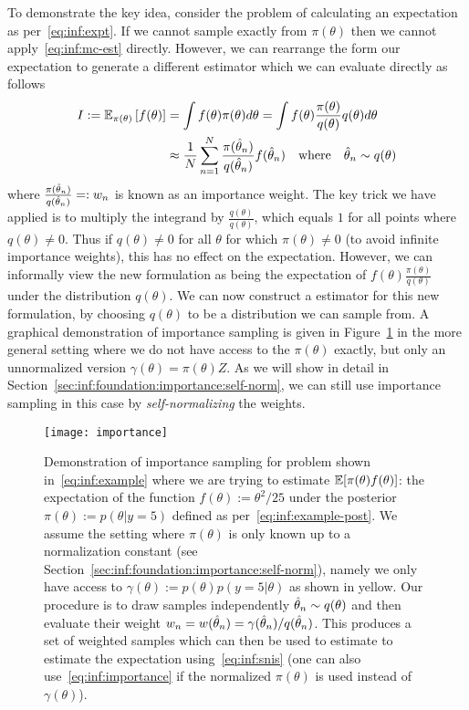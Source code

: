 To demonstrate the key idea, consider the problem of calculating an expectation as
per~\eqref{eq:inf:expt}.  If we cannot sample exactly from $\pi(\theta)$ then we cannot
apply~\eqref{eq:inf:mc-est} directly.  However, we can rearrange the form our expectation
to generate a different \mc estimator which we can evaluate directly as follows
\begin{align}
	I:=\mathbb{E}_{\pi(\theta)} \left[f(\theta)\right] &=\int f(\theta) \pi(\theta) d\theta 
	= \int f(\theta) \frac{\pi(\theta)}{q(\theta)} q(\theta) d\theta \nonumber \\
	&\approx \frac{1}{N} \sum_{n=1}^{N} \frac{\pi(\hat{\theta}_n)}{q(\hat{\theta}_n)} f(\hat{\theta}_n)
	\quad \text{where} \quad \hat{\theta}_n \sim q(\theta) 	\label{eq:inf:importance}
\end{align}
where $\frac{\pi(\hat{\theta}_n)}{q(\hat{\theta}_n)} =: w_n$ is known as an importance weight.
The key trick we have applied is to multiply the integrand by $\frac{q(\theta)}{q(\theta)}$, which
equals $1$
for all points where $q(\theta) \neq 0$.  Thus if $q(\theta) \neq 0$ for all $\theta$ for which
$\pi(\theta) \neq 0$ (to avoid infinite importance weights), this has no effect on the 
expectation.  However, we can informally view the new
formulation as being the expectation of $f(\theta) \frac{\pi(\theta)}{q(\theta)}$ under the
distribution $q(\theta)$.  We can now construct a \mc estimator for this new formulation, 
by choosing $q(\theta)$ to be a distribution we can sample from.  A graphical
demonstration of importance sampling is given in Figure~\ref{fig:inf:importance} in the
more general setting where we do not have access to the $\pi(\theta)$ exactly, but only
an unnormalized version $\gamma(\theta)=\pi(\theta)Z$.  As we will show in detail in
Section~\ref{sec:inf:foundation:importance:self-norm}, we can still use importance sampling
in this case by \emph{self-normalizing} the weights.

\begin{figure}[t]
	\centering
	\texttt{[image: importance]}
	\caption{Demonstration of importance sampling for problem shown in~\eqref{eq:inf:example}
		where we are trying to estimate $\mathbb{E} [\pi(\theta)f(\theta)]$: the expectation of the function $f(\theta) := \theta^2/25$
		under the posterior $\pi(\theta):=p(\theta|y=5)$ defined as per~\eqref{eq:inf:example-post}.
		We assume the setting where $\pi(\theta)$ is only known up to a normalization constant
		(see Section~\ref{sec:inf:foundation:importance:self-norm}), namely we only have access
		to $\gamma(\theta) := p(\theta)p(y=5 | \theta)$ as shown in yellow.  Our procedure is to draw
		samples independently $\hat{\theta}_n \sim q(\theta)$ and then evaluate their weight 
		$w_n = w(\hat{\theta}_n) = \gamma(\hat{\theta}_n)/q(\hat{\theta}_n)$.  This produces a set of weighted samples
		which can then be used to estimate to estimate the expectation using~\eqref{eq:inf:snis}
		(one can also use~\eqref{eq:inf:importance} if the normalized $\pi(\theta)$ is used instead of
		$\gamma(\theta)$).
		\label{fig:inf:importance}}
\end{figure}

